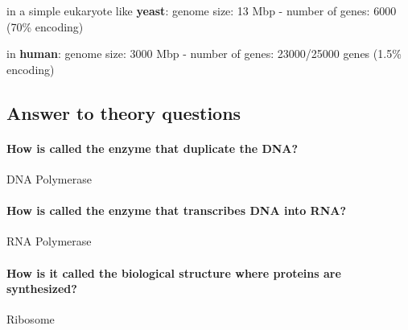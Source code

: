 in a simple eukaryote like \textbf{yeast}: genome size: 13 Mbp -
number of genes: 6000 (70\% encoding)

in \textbf{human}: genome size: 3000 Mbp - number of genes: 23000/25000 genes
(1.5\% encoding)

\subsection{Answer to theory questions}

\paragraph*{How is called the enzyme that duplicate the DNA?} DNA Polymerase
\paragraph*{How is called the enzyme that transcribes DNA into RNA?} RNA Polymerase
\paragraph*{How is it called the biological structure where proteins are
synthesized?} Ribosome
